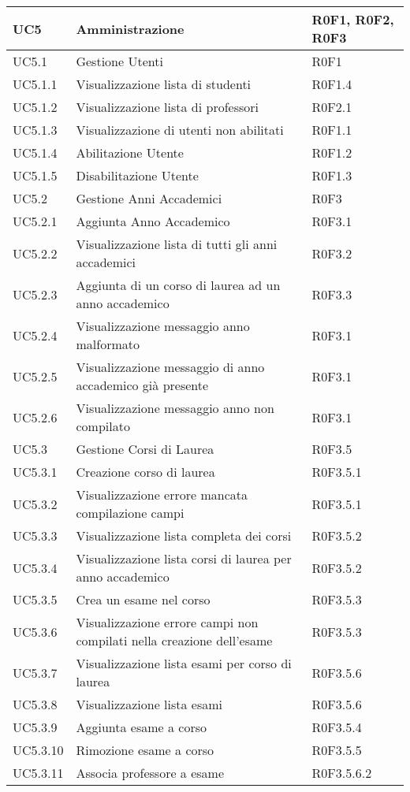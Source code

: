 \documentclass[AnalisiDeiRequisiti.tex]{subfiles}
\begin{document}
\begin{longtable}[H]{|p{2cm}|p{5cm}|p{5cm}|}
	UC5 & Amministrazione &  R0F1, R0F2, R0F3 \\ \hline
	UC5.1 & Gestione Utenti &  R0F1 \\ \hline
	UC5.1.1 & Visualizzazione lista di studenti & R0F1.4 \\ \hline
	UC5.1.2 & Visualizzazione lista di professori &  R0F2.1\\ \hline
	UC5.1.3 & Visualizzazione di utenti non abilitati & R0F1.1 \\ \hline
	UC5.1.4 & Abilitazione Utente & R0F1.2 \\  \hline 
	UC5.1.5 & Disabilitazione Utente & R0F1.3 \\ \hline
	UC5.2 & Gestione Anni Accademici &  R0F3 \\ \hline
	UC5.2.1 & Aggiunta Anno Accademico &  R0F3.1 \\ \hline
	UC5.2.2 & Visualizzazione lista di tutti gli anni accademici & R0F3.2 \\ \hline
	UC5.2.3 & Aggiunta di un corso di laurea ad un anno accademico & R0F3.3 \\ \hline
	UC5.2.4 & Visualizzazione messaggio anno malformato & R0F3.1 \\ \hline
	UC5.2.5 & Visualizzazione messaggio di anno accademico già presente & R0F3.1 \\ \hline
	UC5.2.6 & Visualizzazione messaggio anno non compilato &  R0F3.1 \\ \hline
	UC5.3 & Gestione Corsi di Laurea &  R0F3.5 \\  \hline
	UC5.3.1 & Creazione corso di laurea &  R0F3.5.1 \\ \hline
	UC5.3.2 & Visualizzazione errore mancata compilazione campi & R0F3.5.1 \\ \hline
	UC5.3.3 & Visualizzazione lista completa dei corsi &  R0F3.5.2 \\ \hline
	UC5.3.4 & Visualizzazione lista corsi di laurea per anno accademico & R0F3.5.2  \\ \hline
	UC5.3.5 & Crea un esame nel corso &  R0F3.5.3\\ \hline
	UC5.3.6 & Visualizzazione errore campi non compilati nella creazione dell'esame & R0F3.5.3  \\ \hline
	UC5.3.7 & Visualizzazione lista esami per corso di laurea & R0F3.5.6 \\ \hline
	UC5.3.8 & Visualizzazione lista esami &  R0F3.5.6 \\ \hline
	UC5.3.9 & Aggiunta esame a corso &  R0F3.5.4 \\ \hline
	UC5.3.10 & Rimozione esame a corso &  R0F3.5.5 \\ \hline
	UC5.3.11 & Associa professore a esame & R0F3.5.6.2 \\ \hline
	

\end{longtable}
\end{document}
